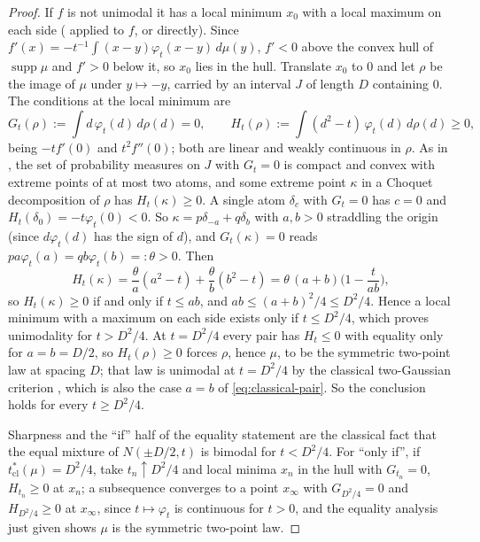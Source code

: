 \documentclass[11pt]{amsart}
\theoremstyle{definition}
\newcommand{\supp}{\operatorname{supp}}
\begin{document}
\begin{proof}
If $f$ is not unimodal it has a local minimum $x_0$ with a local maximum on each side ( applied to $f$, or directly). Since $f'(x)=-t^{-1}\int(x-y)\varphi_t(x-y)\,d\mu(y)$, $f'<0$ above the convex hull of $\supp\mu$ and $f'>0$ below it, so $x_0$ lies in the hull. Translate $x_0$ to $0$ and let $\rho$ be the image of $\mu$ under $y\mapsto-y$, carried by an interval $J$ of length $D$ containing $0$. The conditions at the local minimum are
\[
G_t(\rho):=\int d\,\varphi_t(d)\,d\rho(d)=0,\qquad H_t(\rho):=\int(d^2-t)\,\varphi_t(d)\,d\rho(d)\ge0,
\]
being $-tf'(0)$ and $t^2f''(0)$; both are linear and weakly continuous in $\rho$. As in , the set of probability measures on $J$ with $G_t=0$ is compact and convex with extreme points of at most two atoms, and some extreme point $\kappa$ in a Choquet decomposition of $\rho$ has $H_t(\kappa)\ge0$. A single atom $\delta_c$ with $G_t=0$ has $c=0$ and $H_t(\delta_0)=-t\varphi_t(0)<0$. So $\kappa=p\delta_{-a}+q\delta_b$ with $a,b>0$ straddling the origin (since $d\varphi_t(d)$ has the sign of $d$), and $G_t(\kappa)=0$ reads $pa\varphi_t(a)=qb\varphi_t(b)=:\theta>0$. Then
\begin{equation}\label{eq:classical-pair}
H_t(\kappa)=\frac\theta a(a^2-t)+\frac\theta b(b^2-t)=\theta\,(a+b)\Big(1-\frac t{ab}\Big),
\end{equation}
so $H_t(\kappa)\ge0$ if and only if $t\le ab$, and $ab\le(a+b)^2/4\le D^2/4$. Hence a local minimum with a maximum on each side exists only if $t\le D^2/4$, which proves unimodality for $t>D^2/4$. At $t=D^2/4$ every pair has $H_t\le0$ with equality only for $a=b=D/2$, so $H_t(\rho)\ge0$ forces $\rho$, hence $\mu$, to be the symmetric two-point law at spacing $D$; that law is unimodal at $t=D^2/4$ by the classical two-Gaussian criterion \cite{Eisenberger, RobertsonFryer, Behboodian}, which is also the case $a=b$ of \eqref{eq:classical-pair}. So the conclusion holds for every $t\ge D^2/4$.

Sharpness and the ``if'' half of the equality statement are the classical fact that the equal mixture of $N(\pm D/2,t)$ is bimodal for $t<D^2/4$. For ``only if'', if $t^*_{\mathrm{cl}}(\mu)=D^2/4$, take $t_n\uparrow D^2/4$ and local minima $x_n$ in the hull with $G_{t_n}=0$, $H_{t_n}\ge0$ at $x_n$; a subsequence converges to a point $x_\infty$ with $G_{D^2/4}=0$ and $H_{D^2/4}\ge0$ at $x_\infty$, since $t\mapsto\varphi_t$ is continuous for $t>0$, and the equality analysis just given shows $\mu$ is the symmetric two-point law.
\end{proof}
\end{document}
